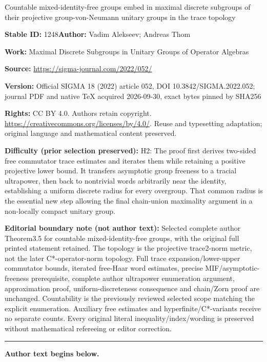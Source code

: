 \documentclass[11pt]{article}
\numberwithin{equation}{section}
\numberwithin{equation}{section}
\begin{document}
\begin{center}\Large Countable mixed-identity-free groups embed in maximal discrete subgroups of their projective group-von-Neumann unitary groups in the trace topology\end{center}
\noindent\textbf{Stable ID:} 1248\quad\textbf{Author:} Vadim Alekseev; Andreas Thom\par
\noindent\textbf{Work:} Maximal Discrete Subgroups in Unitary Groups of Operator Algebras\par
\noindent\textbf{Source:} \url{https://sigma-journal.com/2022/052/}\par
\noindent\textbf{Version:} Official SIGMA 18 (2022) article 052, DOI 10.3842/SIGMA.2022.052; journal PDF and native TeX acquired 2026-09-30, exact bytes pinned by SHA256\par
\noindent\textbf{Rights:} CC BY 4.0. Authors retain copyright. \url{https://creativecommons.org/licenses/by/4.0/}. Reuse and typesetting adaptation; original language and mathematical content preserved.\par
\noindent\textbf{Difficulty (prior selection preserved):} {\CJKfont H2: The proof first derives two-sided free commutator trace estimates and iterates them while retaining a positive projective lower bound. It transfers asymptotic group freeness to a tracial ultrapower, then back to nontrivial words arbitrarily near the identity, establishing a uniform discrete radius for every overgroup. That common radius is the essential new step allowing the final chain-union maximality argument in a non-locally compact unitary group.}\par
\medskip\noindent\textbf{Editorial boundary note (not author text):} Selected complete author Theorem3.5 for countable mixed-identity-free groups, with the original full printed statement retained. The topology is the projective trace2-norm metric, not the later C*-operator-norm topology. Full trace expansion/lower-upper commutator bounds, iterated free-Haar word estimates, precise MIF/asymptotic-freeness prerequisite, complete author ultrapower enumeration argument, approximation proof, uniform-discreteness consequence and chain/Zorn proof are unchanged. Countability is the previously reviewed selected scope matching the explicit enumeration. Auxiliary free estimates and hyperfinite/C*-variants receive no separate counts. Every original literal inequality/index/wording is preserved without mathematical refereeing or editor correction.\par
\medskip\hrule\medskip\noindent\textbf{Author text begins below.}\par
\end{document}
